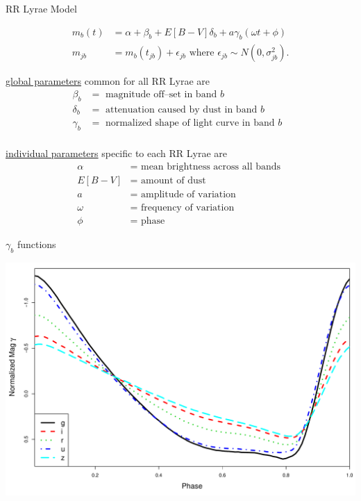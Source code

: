 \documentclass[12pt]{beamer}
\begin{document}
\begin{frame}{RR Lyrae Model}

\vspace{-.2in}

\begin{align*}
m_b(t) &= \alpha + \beta_b + E[B-V]\delta_b + a\gamma_b(\omega t + \phi)\\
m_{jb} &= m_b(t_{jb}) + \epsilon_{jb} \text{   where  } \epsilon_{jb} \sim N(0,\sigma_{jb}^2).
\end{align*}



\underline{global parameters} common for all RR Lyrae are
\begin{align*}
\beta_b &=  \text{ magnitude off--set in band $b$ }\\
\delta_b &= \text{ attenuation caused by dust in band $b$ }\\
\gamma_b &= \text{ normalized shape of light curve in band $b$ }\\
\end{align*}

\vspace{-.2in}

\underline{individual parameters} specific to each RR Lyrae are
\begin{align*}
\alpha &= \text{ mean brightness across all bands }\\
E[B-V] &= \text{ amount of dust }\\
a &= \text{ amplitude of variation }\\
\omega &= \text{ frequency of variation }\\
\phi &= \text{ phase }
\end{align*}

\end{frame}



\begin{frame}{$\gamma_b$ functions}

\begin{center}
\includegraphics[scale=.3]{figs/templates.pdf}
\end{center}

\end{frame}
\end{document}
